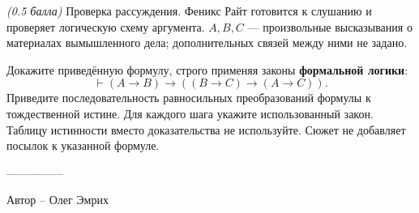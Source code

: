 \question
\textit{(0.5 балла)} Проверка рассуждения. Феникс Райт готовится к слушанию и проверяет логическую схему аргумента. $A,B,C$ --- произвольные высказывания о материалах вымышленного дела; дополнительных связей между ними не задано.

Докажите приведённую формулу, строго применяя законы \textbf{формальной логики}:
\[
\vdash (A\to B)\to((B\to C)\to(A\to C)).
\]
Приведите последовательность равносильных преобразований формулы к тождественной истине. Для каждого шага укажите использованный закон. Таблицу истинности вместо доказательства не используйте. Сюжет не добавляет посылок к указанной формуле.

---------------

Автор -- Олег Эмрих
